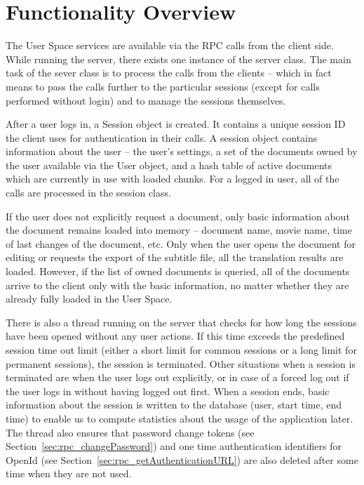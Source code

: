 
\section{Functionality Overview}

The User Space services are available via the RPC calls from the client side. While running the server, there exists one instance of the server class. The main task of the sever class is to process the calls from the clients -- which in fact means to pass the calls further to the particular sessions (except for calls performed without login) and to manage the sessions themselves.

After a user logs in, a Session object is created. It contains a unique session ID the client uses for authentication in their calls. A session object contains information about the user -- the user's settings, a set of the documents owned by the user available via the User object, and a hash table of active documents which are currently in use with loaded chunks. For a logged in user, all of the calls are processed in the session class.

If the user does not explicitly request a document, only basic information about the document remains loaded into memory -- document name, movie name, time of last changes of the document, etc. Only when the user opens the document for editing or requests the export of the subtitle file, all the
translation results
are loaded. However, if the list of owned documents is queried, all of the documents arrive to the client only with the basic information, no matter whether they are already fully loaded in the User Space.

There is also a thread running on the server that checks for how long the sessions have been opened without any user actions. If this time exceeds the predefined session time out limit (either a short limit for common sessions or a long limit for permanent sessions), the session is terminated. Other situations when a session is terminated are when the user logs out explicitly, or in case of a forced log out if the user logs in without having logged out first. When a session ends, basic information about the session is written to the database (user, start time, end time) to enable us to compute statistics about the usage of the application later. The thread also ensures that password change tokens (see Section~\ref{sec:rpc_changePassword}) and one time authentication identifiers for OpenId (see Section~\ref{sec:rpc_getAuthenticationURL}) are also deleted after some time when they are not used.

